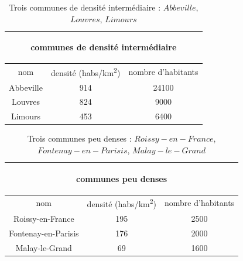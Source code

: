 \documentclass{book}
\begin{document}
\begin{table}
\begin{center}
\begin{adjustbox}{max width=\textwidth}
\begin{tabular}{|c|c|c|}
\hline
\multicolumn{3}{c|}{\begin{bf}communes de densité intermédiaire\end{bf}} \\
\hline 
nom & densité (habs/km\textsuperscript{2}) & nombre d'habitants \\
\hline 
Abbeville & 914 & 24100\\
\hline 
Louvres & 824 & 9000 \\
\hline 
Limours & 453 & 6400 \\
\hline
\end{tabular}
\end{adjustbox}
\end{center}
\caption{Trois communes de densité intermédiaire : $Abbeville$, $Louvres$, $Limours$}
\label{cat2}
\end{table}

\begin{table}
\begin{center}
\begin{adjustbox}{max width=\textwidth}
\begin{tabular}{|c|c|c|}
\hline
\multicolumn{3}{c|}{\begin{bf}communes peu denses\end{bf}} \\
\hline 
nom & densité (habs/km\textsuperscript{2}) & nombre d'habitants \\
\hline 
Roissy-en-France & 195 & 2500\\
\hline 
Fontenay-en-Parisis & 176 & 2000 \\
\hline 
Malay-le-Grand & 69 & 1600 \\
\hline
\end{tabular}
\end{adjustbox}
\end{center}
\caption{Trois communes peu denses : $Roissy-en-France$, $Fontenay-en-Parisis$, $Malay-le-Grand$}
\label{cat3}
\end{table}
\end{document}
